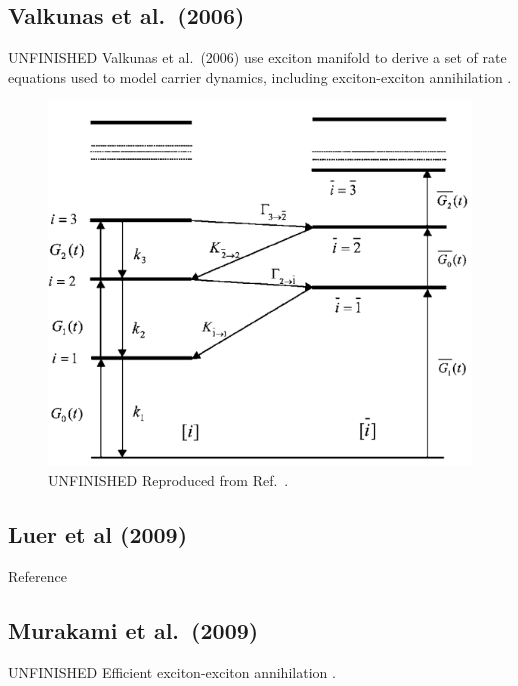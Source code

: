 \subsection{Valkunas et al.\ (2006)}
{\color{red} UNFINISHED} Valkunas et al.\ (2006) use exciton manifold to derive a set of rate equations used to model carrier dynamics, including exciton-exciton annihilation \cite{valkunas2006exciton}.

\begin{figure}[ht]
	\centering
	\includegraphics[scale=0.5]{images/chapter_prior_works/exciton_manifold_valkunas_2006}
	\caption{ {\color{red} UNFINISHED} Reproduced from Ref.\ \cite{valkunas2006exciton}. }
	\label{fig:exciton_manif_valkunas}
\end{figure}

\subsection{Luer et al (2009)}
Reference \cite{luer2009size}

\subsection{Murakami et al.\ (2009)}
{\color{red} UNFINISHED} Efficient exciton-exciton annihilation \cite{murakami2009existence}.




